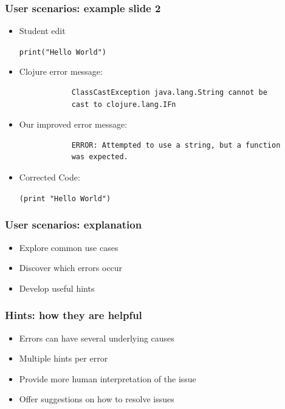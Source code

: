 \documentclass{beamer}
\begin{document}
\begin{frame}[fragile]
\frametitle{User scenarios: example slide 2}

	\begin{itemize}
	\item Student edit
		
				\texttt{print("Hello World")}
				
		\item Clojure error message:	
	
			\begin{verbatim}
			ClassCastException java.lang.String cannot be
			cast to clojure.lang.IFn
			\end{verbatim} 
	
		\item Our improved error message:	
	
			\begin{verbatim}
			ERROR: Attempted to use a string, but a function
			was expected.
			\end{verbatim}
	
		\item Corrected Code:
		
			\texttt{\alert{(print} "Hello World")}
	\end{itemize} 	

\end{frame}

\begin{frame}
\frametitle{User scenarios: explanation}
	\begin{itemize}
  	 \item Explore common use cases
  	 \item Discover which errors occur
  	 \item Develop useful hints
	 \end{itemize}
\end{frame}

\begin{frame}
\frametitle{Hints: how they are helpful}
	\begin{itemize}
  	 \item Errors can have several underlying causes
  	 \item Multiple hints per error
  	 \item Provide more human interpretation of the issue
  	 \item Offer suggestions on how to resolve issues
	 \end{itemize}
\end{frame}
\end{document}

